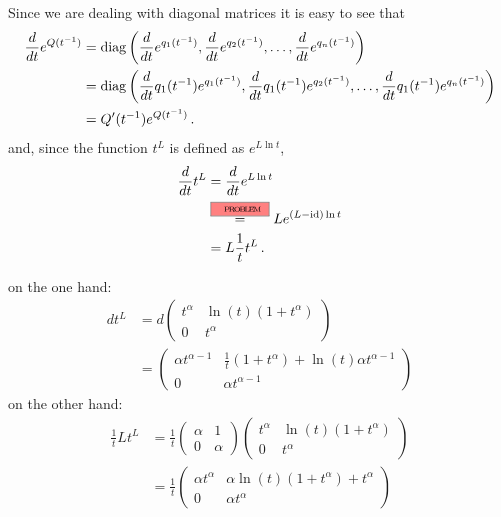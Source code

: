 \begin{rem}
  Since we are dealing with diagonal matrices it is easy to see that
  \begin{align*}
    \frac{d}{dt}e^{Q(t^{-1})}
    &=\operatorname{diag}\left(\frac{d}{dt}e^{q_1(t^{-1})},\frac{d}{dt}e^{q_2(t^{-1})}
      ,\dots,
      \frac{d}{dt}e^{q_n(t^{-1})}\right)
      \\&=\operatorname{diag}\left(\frac{d}{dt}q_1(t^{-1})e^{q_1(t^{-1})}
                    ,\frac{d}{dt}q_1(t^{-1})e^{q_2(t^{-1})}
                    ,\dots
                    ,\frac{d}{dt}q_1(t^{-1})e^{q_n(t^{-1})}\right)
  \\&=Q'(t^{-1})e^{Q(t^{-1})} \,.
  \end{align*}
  and, since the function $t^L$ is defined as $e^{L\ln t}$,
  \begin{align*}
    \frac{d}{dt}t^L&=\frac{d}{dt}e^{L\ln t}
    \\&\overset{\PROBLEM}{=}Le^{(L-\id)\ln t}
    \\&=L\frac{1}{t}t^L \,.
  \end{align*}
  \begin{s-rem}
    on the one hand:
    \begin{align*}
      dt^L
      &= d\begin{pmatrix}
        t^\alpha & \ln(t)(1+t^\alpha) \\ 0 & t^\alpha
      \end{pmatrix}
      \\&=
      \begin{pmatrix}
        \alpha t^{\alpha-1} & \frac{1}{t}(1+t^\alpha)+\ln(t)\alpha t^{\alpha-1}
        \\ 0 & \alpha t^{\alpha-1}
      \end{pmatrix}
    \end{align*}
    on the other hand:
    \begin{align*}
      \frac{1}{t}Lt^L
      &= \frac{1}{t}
      \begin{pmatrix}
        \alpha & 1 \\ 0 & \alpha
      \end{pmatrix}
      \begin{pmatrix}
        t^\alpha & \ln(t)(1+t^\alpha) \\ 0 & t^\alpha
      \end{pmatrix}
      \\&= \frac{1}{t}
      \begin{pmatrix}
        \alpha t^\alpha & \alpha\ln(t)(1+t^\alpha) + t^\alpha
        \\ 0 & \alpha t^\alpha

\end{pmatrix}
\end{align*}
\end{s-rem}
\end{rem}

